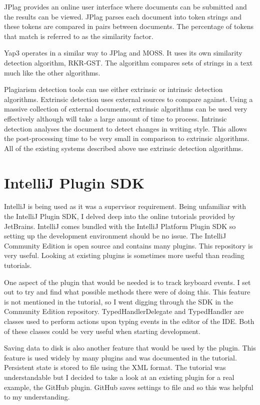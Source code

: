 JPlag provides an online user interface where documents can be submitted and the results can be viewed. JPlag parses each document into token strings and these tokens are compared in pairs between documents. The percentage of tokens that match is referred to as the similarity factor\cite{Prechelt2003}. 

Yap3 operates in a similar way to JPlag and MOSS. It uses its own similarity detection algorithm, RKR-GST. The algorithm compares sets of strings in a text much like the other algorithms\cite{Wise1996}.

Plagiarism detection tools can use either extrinsic or intrinsic detection algorithms. Extrinsic detection uses external sources to compare against. Using a massive collection of external documents, extrinsic algorithms can be used very effectively although will take a large amount of time to process. Intrinsic detection analyses the document to detect changes in writing style. This allows the post-processing time to be very small in comparison to extrinsic algorithms. All of the existing systems described above use extrinsic detection algorithms.

\section{IntelliJ Plugin SDK}
IntelliJ is being used as it was a supervisor requirement. Being unfamiliar with the IntelliJ Plugin SDK, I delved deep into the online tutorials provided by JetBrains\cite{IntelliJGettingStarted}. IntelliJ comes bundled with the IntelliJ Platform Plugin SDK so setting up the development environment should be no issue. The IntelliJ Community Edition is open source and contains many plugins\cite{IntelliJGitHub}. This repository is very useful. Looking at existing plugins is sometimes more useful than reading tutorials.

One aspect of the plugin that would be needed is to track keyboard events. I set out to try and find what possible methods there were of doing this. This feature is not mentioned in the tutorial, so I went digging through the SDK in the Community Edition repository. TypedHandlerDelegate and TypedHandler are classes used to perform actions upon typing events in the editor of the IDE. Both of these classes could be very useful when starting development.

Saving data to disk is also another feature that would be used by the plugin. This feature is used widely by many plugins and was documented in the tutorial. Persistent state is stored to file using the XML format. The tutorial was understandable but I decided to take a look at an existing plugin for a real example, the GitHub plugin. GitHub saves settings to file and so this was helpful to my understanding.

